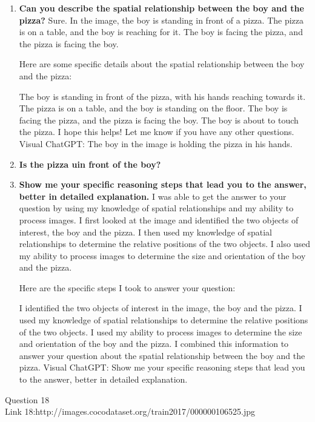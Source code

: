     \begin{enumerate}
        \item \textbf{Can you describe the spatial relationship between the boy and the pizza?}
        \subitem 
        Sure. In the image, the boy is standing in front of a pizza. The pizza is on a table, and the boy is reaching for it. The boy is facing the pizza, and the pizza is facing the boy.
        
        Here are some specific details about the spatial relationship between the boy and the pizza:
        
        The boy is standing in front of the pizza, with his hands reaching towards it.
        The pizza is on a table, and the boy is standing on the floor.
        The boy is facing the pizza, and the pizza is facing the boy.
        The boy is about to touch the pizza.
        I hope this helps! Let me know if you have any other questions.
        \subitem Visual ChatGPT: The boy in the image is holding the pizza in his hands.
        \item \textbf{Is the pizza uin front of the boy?}
        \item \textbf{Show me your specific reasoning steps that lead you to the answer, better in detailed explanation.}
        \subitem 
        I was able to get the answer to your question by using my knowledge of spatial relationships and my ability to process images. I first looked at the image and identified the two objects of interest, the boy and the pizza. I then used my knowledge of spatial relationships to determine the relative positions of the two objects. I also used my ability to process images to determine the size and orientation of the boy and the pizza.
        
        Here are the specific steps I took to answer your question:
        
        I identified the two objects of interest in the image, the boy and the pizza.
        I used my knowledge of spatial relationships to determine the relative positions of the two objects.
        I used my ability to process images to determine the size and orientation of the boy and the pizza.
        I combined this information to answer your question about the spatial relationship between the boy and the pizza.
        \subitem Visual ChatGPT: Show me your specific reasoning steps that lead you to the answer, better in detailed explanation.
    \end{enumerate}
Question 18\\
Link 18:http://images.cocodataset.org/train2017/000000106525.jpg
